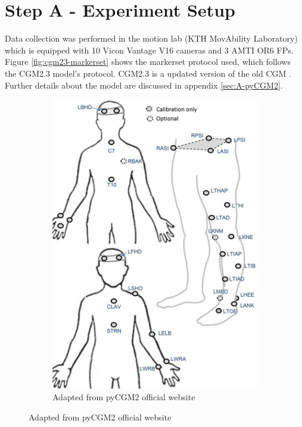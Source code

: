 \documentclass[../main.tex]{subfiles}
\begin{document}
\section{Step A - Experiment Setup}
Data collection was performed in the motion lab (KTH MovAbility Laboratory) which is equipped with 10 Vicon Vantage V16 cameras and 3 AMTI OR6 \acp{FP}. 
Figure \ref{fig:cgm23-markerset} shows the markerset protocol used, which follows the CGM2.3 model's protocol. 
CGM2.3 is a updated version of the old \ac{CGM} \cite{Leboeuf2019}.
Further details about the model are discussed in appendix \ref{sec:A-pyCGM2}.
\begin{figure}[!ht]
     \centering
     \begin{subfigure}[t]{0.58\textwidth}
         \centering
         \includegraphics[width=\textwidth]{img/CGM23_markerset.pdf}
         \caption{Adapted from pyCGM2 official website \cite{Leboeuf2019}}

\end{subfigure}
\end{figure}
\end{document}
